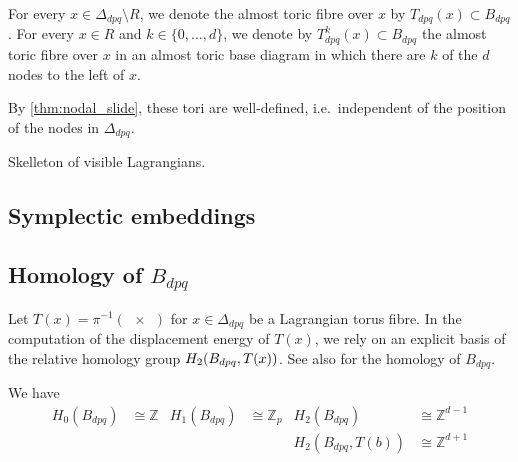 \documentclass[12pt,a4paper,draft]{scrartcl}
\begin{document}
\begin{definition}
    For every $x \in \Delta_{dpq} \setminus R$, we denote the almost toric fibre over $x$ by $T_{dpq}(x) \subset B_{dpq}$. For every $x \in R$ and $k \in \{0,\ldots,d\}$, we denote by $T^k_{dpq}(x) \subset B_{dpq}$ the almost toric fibre over $x$ in an almost toric base diagram in which there are $k$ of the $d$ nodes to the left of $x$.
\end{definition}

By \cref{thm:nodal_slide}, these tori are well-defined, i.e.\ independent of the position of the nodes in $\Delta_{dpq}$. 

\begin{remark}
  \label{rem:B_dpq_skeleton}
  Skelleton of visible Lagrangians.
\end{remark}

\subsection{Symplectic embeddings}

\subsection{Homology of \texorpdfstring{$B_{dpq}$}{Bdpq}}
\label{sec:homology}

Let $T(x) = π^{-1}(\qty{x})$ for $x ∈ Δ_{dpq}$ be a Lagrangian torus fibre. In the computation of the displacement energy of $T(x)$, we rely on an explicit basis of the relative homology group $H_2\qty(B_{dpq},T(x))$.
See also \cite[Lemma 7.11]{evans2021atfs} for the homology of $B_{dpq}$.

\begin{lemma}
  \label{thm:homology}
  We have
  \begin{align*}
    H_0(B_{dpq}) &≅ ℤ & H_1(B_{dpq}) &≅ ℤ_p & H_2(B_{dpq}) &≅ ℤ^{d-1} \\
                 &    &              &      & H_2(B_{dpq},T(b)) &≅ ℤ^{d+1}
  \end{align*}
\end{lemma}
\end{document}
